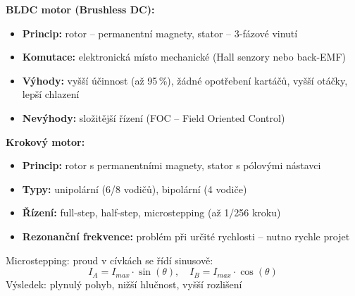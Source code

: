 \documentclass[a4paper,10pt]{article}
\begin{document}
\begin{vysvetlenibox}
\begin{center}
\end{center}

\textbf{BLDC motor (Brushless DC):}
\begin{itemize}[noitemsep, leftmargin=1.4em, topsep=4pt]
    \item \textbf{Princip:} rotor -- permanentní magnety, stator -- 3-fázové vinutí
    \item \textbf{Komutace:} elektronická místo mechanické (Hall senzory nebo back-EMF)
    \item \textbf{Výhody:} vyšší účinnost (až 95\,\%), žádné opotřebení kartáčů,
          vyšší otáčky, lepší chlazení
    \item \textbf{Nevýhody:} složitější řízení (FOC -- Field Oriented Control)
\end{itemize}

\textbf{Krokový motor:}
\begin{itemize}[noitemsep, leftmargin=1.4em, topsep=4pt]
    \item \textbf{Princip:} rotor s permanentními magnety, stator s pólovými nástavci
    \item \textbf{Typy:} unipolární (6/8 vodičů), bipolární (4 vodiče)
    \item \textbf{Řízení:} full-step, half-step, microstepping (až 1/256 kroku)
    \item \textbf{Rezonanční frekvence:} problém při určité rychlosti -- nutno rychle projet
\end{itemize}

\begin{vzorcebox}
Microstepping: proud v cívkách se řídí sinusově:
$$I_A = I_{max} \cdot \sin(\theta), \quad I_B = I_{max} \cdot \cos(\theta)$$
Výsledek: plynulý pohyb, nižší hlučnost, vyšší rozlišení
\end{vzorcebox}


\end{vysvetlenibox}
\end{document}
